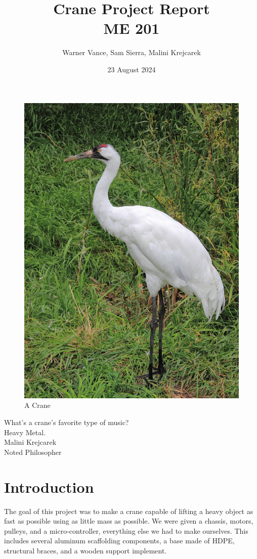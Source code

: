 \documentclass[letterpaper, 12pt]{article}
\title{%
    Crane Project Report \\
\large ME 201
}
\author{Warner Vance, Sam Sierra, Malini Krejcarek}
\date{23 August 2024}
\begin{document}
\maketitle
\begin{figure}[H]
    \centering
    \includegraphics[scale = 0.1]{American Crane Sasata.jpg}
    \caption{A Crane}
\end{figure}
\begin{center}
    \LARGE What's a crane's favorite type of music?\\
    \Large Heavy Metal. \\
    \footnotesize Malini Krejcarek \\
    \tiny Noted Philosopher \\
\end{center}

    

\section{Introduction}
The goal of this project was to make a crane capable of lifting a heavy object as fast as possible using as little mass as possible. 
We were given a chassis, motors, pulleys,  and a micro-controller, everything else we had to make ourselves. 
This includes several aluminum scaffolding components, a base made of HDPE, structural braces, and a wooden support implement. 
\end{document}
